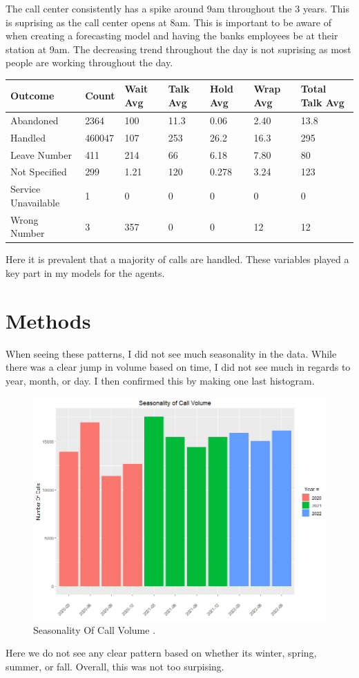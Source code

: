 \documentclass[12pt]{article}
\begin{document}
The call center consistently has a spike around 9am throughout the 3 years. This is suprising as the call center opens at 8am. This is important to be aware of when
creating a forecasting model and having the banks employees be at their station at 9am. The decreasing trend throughout the day is not suprising
as most people are working throughout the day.
\begin{table}[H]
  \resizebox{\textwidth}{!} {
  \begin{tabular}{ l | l | l | l | l | l | l}
    {\bf Outcome} & {\bf Count} & {\bf Wait Avg} & {\bf Talk Avg} & {\bf Hold Avg} & {\bf Wrap Avg} & {\bf Total Talk Avg} \\
  \hline
  Abandoned & 2364 & 100 & 11.3 & 0.06 & 2.40 & 13.8 \\
  \hline
  Handled & 460047 & 107 & 253 & 26.2 & 16.3 & 295\\
  \hline
  Leave Number & 411 & 214 & 66 & 6.18 & 7.80 & 80\\
  \hline
  Not Specified & 299 & 1.21 & 120 & 0.278 & 3.24 & 123\\
  \hline
  Service Unavailable & 1 & 0 & 0 & 0 & 0 & 0\\
  \hline
  Wrong Number & 3 & 357 & 0 & 0 & 12 & 12\\
  \end{tabular}
  }
  \end{table}
Here it is prevalent that a majority of calls are handled. These variables played a key part in my models for the agents.
\section*{Methods}
When seeing these patterns, I did not see much seasonality in the data. While there was a clear jump in volume based on time, I did not see much in regards
to year, month, or day. I then confirmed this by making one last histogram.
\begin{figure}[H]
  \centering
  \includegraphics[width=\textwidth]{SeasonalityOfCallVolume.png}
  \caption{Seasonality Of Call Volume .}
  \label{fig:Seasonality}
\end{figure}
Here we do not see any clear pattern based on whether its winter, spring, summer, or fall. Overall, this was not too surpising.
\end{document}
